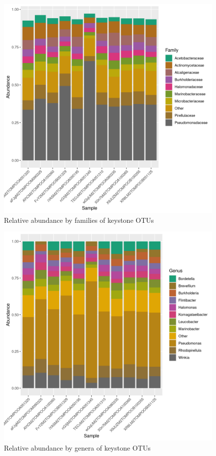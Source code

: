 \begin{figure}
\centering
\includegraphics[scale = 0.8]{tomate_aleatorio1_6.csv_relative_abundance_Family.png}
\caption{Relative abundance by families of keystone OTUs }
\label{fig:tomate_aleatorio1_6.csv_family}
\end{figure}
\begin{figure}
\centering
\includegraphics[scale = 0.8]{tomate_aleatorio1_6.csv_relative_abundance_Genus.png}
\caption{Relative abundance by genera of keystone OTUs }
\label{fig:tomate_aleatorio1_6.csv_genus}
\end{figure}
